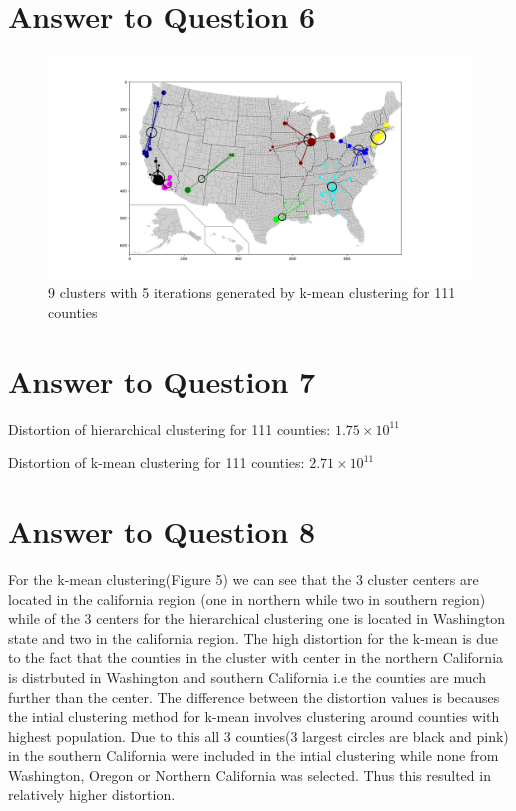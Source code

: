 \documentclass[a4paper]{article}
\begin{document}
\section*{Answer to Question 6}
\FloatBarrier
\begin{figure}[h]
	\centering 
	\includegraphics[scale = 0.5, clip=True, trim=5.5cm 1.5cm 0cm 2.5cm]{Q6_clustering_k_mean.png}
	\caption{9 clusters with 5 iterations generated by k-mean clustering for 111 counties}
\end{figure}
\FloatBarrier
 

\section*{Answer to Question 7}

Distortion of hierarchical clustering for 111 counties: $1.75 \times 10^{11}$ 

Distortion of k-mean clustering for 111 counties: $2.71 \times 10^{11}$

\section*{Answer to Question 8}
For the k-mean clustering(Figure 5) we can see that the 3 cluster centers are located in the california region (one in northern while two in southern region) while of the 3 centers for the hierarchical clustering one is located in Washington state  and two in the california region. The high distortion for the k-mean is due to the fact that the counties in the cluster with center in the northern California is distrbuted in Washington and southern California i.e the counties are much further than the center. The difference between the distortion values is becauses the intial clustering method for k-mean involves clustering around counties with highest population. Due to this all 3 counties(3 largest circles are black and pink) in the southern California were included in the intial clustering while none from Washington, Oregon or Northern California was selected. Thus this resulted in relatively higher distortion.
\end{document}
